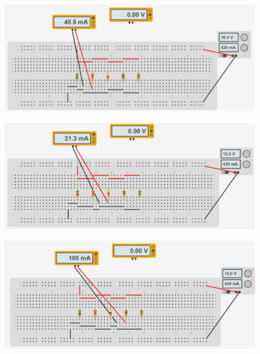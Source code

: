 \begin{figure}[H]
\begin{minipage}{0.45\textwidth}
      \label{fig: Simulacion Conexion Paralelo IR1}
    \end{minipage}
    \hfill
    \begin{minipage}{0.45\textwidth}
      \centering
      \includegraphics[width=\textwidth]{Figures/1. Content/simulation/paraleloAR2.png}
      \label{fig: Simulacion Conexion Paralelo IR2}
    \end{minipage}
    \hfill
    \begin{minipage}{0.45\textwidth}
      \centering
      \includegraphics[width=\textwidth]{Figures/1. Content/simulation/paraleloAR3.png}
      \label{fig: Simulacion Conexion Paralelo IR3}
    \end{minipage}
    \hfill
    \begin{minipage}{0.45\textwidth}
      \centering
      \includegraphics[width=\textwidth]{Figures/1. Content/simulation/paraleloAR4.png}

\end{minipage}
\end{figure}
